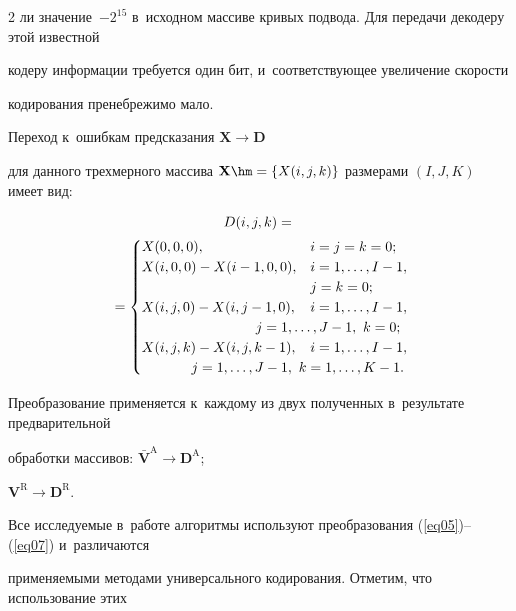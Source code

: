 \begin{multicols}{2}
ли значение~$-2^{15}$ в~исходном массиве кривых подвода. Для передачи декодеру этой известной 

кодеру информации требуется один бит, и~соответствующее увеличение скорости

 кодирования пренебрежимо мало.



Переход к~ошибкам предсказания $\mathbf{X}\to\mathbf{D}$ 

для данного трехмерного массива $\mathbf{X}\hm=\{X(i,j,k)\}$ размерами $(I,J,K)$ имеет вид:

\begin{multline}

D(i,j,k) ={}\\

\!\!{}=

\begin{cases}

X(0,0,0),                          & i=j=k=0; \\ 

X(i,0,0)-X(i-1,0,0), & i=1,\dots,I-1,\\

& j=k=0; \\

X(i,j,0)-X(i,j-1,0),  & i=1,\dots,I-1,\\

& \hspace*{-39pt}j=1,\dots,J-1,\ k=0; \\

X(i,j,k)-X(i,j,k-1),  & i=1,\dots,I-1,\\

& \hspace*{-85pt}j=1,\dots,J-1,\ k=1,\dots,K-1.

\end{cases}

\!\!\label{eq07}

\end{multline}

Преобразование применяется к~каждому из двух полученных в~результате предварительной 

обработки массивов: $\bar{\mathbf{V}}^\text{A}\to\mathbf{D}^\text{A}$; 

$\mathbf{V}^\text{R}\to\mathbf{D}^\text{R}$.



Все исследуемые в~работе алгоритмы используют преобразования (\ref{eq05})--(\ref{eq07}) и~различаются 

применяемыми методами универсального кодирования. Отметим, что использование этих 


\end{multicols}
